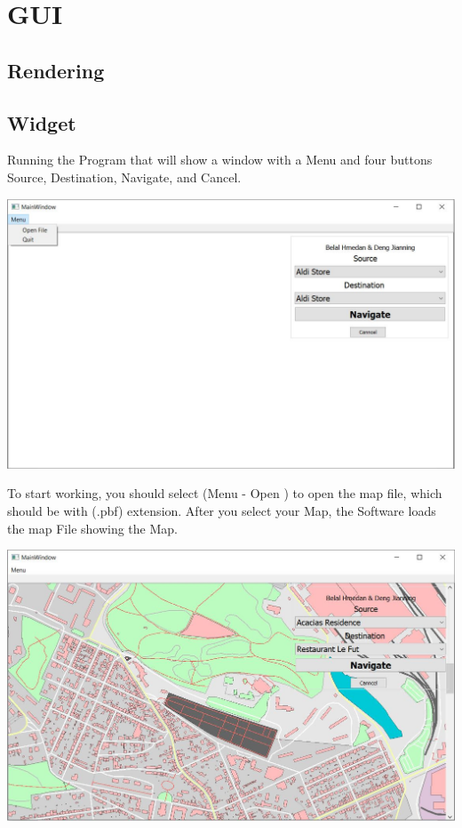 \documentclass[a4paper, 12pt, english]{book}
\begin{document}
\section{GUI}
\subsection{Rendering}




\subsection{Widget}
Running the Program that will show a window with a Menu and four buttons Source, Destination, Navigate, and Cancel.
\begin{center}
\includegraphics[width=.6\textwidth]{GUI_NoMap.JPG}
\end{center}
To start working, you should select (Menu - Open )
to open the map file, which should be with (.pbf) extension.
After you select your Map, the Software loads the map File showing the Map.
\begin{center}
\includegraphics[width=.6\textwidth]{GUI_Map0.JPG}
\end{center}
\end{document}
